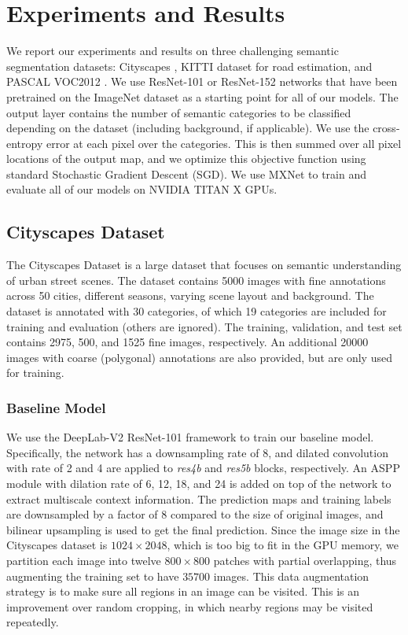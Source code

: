 \documentclass[10pt,twocolumn,letterpaper]{article}
\begin{document}
\section{Experiments and Results}
We report our experiments and results on three challenging semantic segmentation datasets: Cityscapes \cite{Cordts2016Cityscapes}, KITTI dataset \cite{Fritsch2013ITSC} for road estimation, and PASCAL VOC2012 \cite{pascal-voc-2012}. We use ResNet-101 or ResNet-152 networks that have been pretrained on the ImageNet dataset as a starting point for all of our models. The output layer contains the number of semantic categories to be classified depending on the dataset (including background, if applicable). We use the cross-entropy error at each pixel over the categories. This is then summed over all pixel locations of the output map, and we optimize this objective function using standard Stochastic Gradient Descent (SGD). We use MXNet \cite{chen2015mxnet} to train and evaluate all of our models on NVIDIA TITAN X GPUs.

\subsection{Cityscapes Dataset}
The Cityscapes Dataset is a large dataset that focuses on semantic understanding of urban street scenes. The dataset contains 5000 images with fine annotations across 50 cities, different seasons, varying scene layout and background. The dataset is annotated with 30 categories, of which 19 categories are included for training and evaluation (others are ignored). The training, validation, and test set contains 2975, 500, and 1525 fine images, respectively. An additional 20000 images with coarse (polygonal) annotations are also provided, but are only used for training.
\vspace{-5pt}

\subsubsection{Baseline Model}
We use the DeepLab-V2 \cite{chen2016deeplab} ResNet-101 framework to train our baseline model. Specifically, the network has a downsampling rate of 8, and dilated convolution with rate of 2 and 4 are applied to \textit{res4b} and \textit{res5b} blocks, respectively. An ASPP module with dilation rate of 6, 12, 18, and 24 is added on top of the network to extract multiscale context information. The prediction maps and training labels are downsampled by a factor of 8 compared to the size of original images, and bilinear upsampling is used to get the final prediction. Since the image size in the Cityscapes dataset is $1024\times 2048$, which is too big to fit in the GPU memory, we partition each image into twelve $800\times 800$ patches with partial overlapping, thus augmenting the training set to have $35700$ images. This data augmentation strategy is to make sure all regions in an image can be visited. This is an improvement over random cropping, in which nearby regions may be visited repeatedly.
\end{document}
